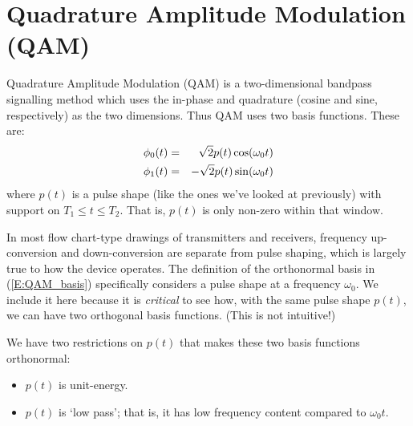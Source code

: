 




\section{Quadrature Amplitude Modulation (QAM)}

Quadrature Amplitude Modulation (QAM) is a two-dimensional
bandpass signalling method which uses the in-phase and quadrature (cosine and sine, respectively) as the two dimensions.  Thus QAM uses two basis functions.  These are:
\begin{eqnarray} \label{E:QAM_basis}
  \phi_0(t) &=& \sqrt{2} p(t) \cos(\omega_0 t) \nonumber \\ 
  \phi_1(t) &=& - \sqrt{2} p(t) \sin(\omega_0 t) 
\end{eqnarray}
where $p(t)$ is a pulse shape (like the ones we've looked at
previously) with support on $T_1 \le t \le T_2$.  That is, $p(t)$ is
only non-zero within that window.

In most flow chart-type drawings of transmitters and receivers, frequency up-conversion and down-conversion are separate from pulse shaping, which is largely true to how the device operates.  The definition of the orthonormal basis in (\ref{E:QAM_basis}) specifically considers a pulse shape at a frequency $\omega_0$.  We include it here because it is \emph{critical} to see how, with the same pulse shape $p(t)$, we can have two orthogonal basis functions.  (This is not intuitive!)

We have two restrictions on $p(t)$ that makes these two basis
functions orthonormal:
\begin{itemize}
  \item $p(t)$ is unit-energy.
  \item $p(t)$ is `low pass'; that is, it has low frequency content
  compared to $\omega_0 t$.
\end{itemize}

